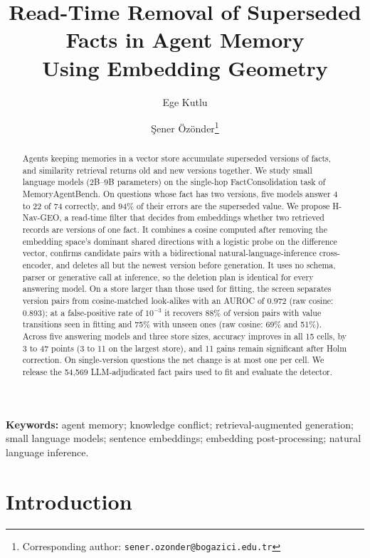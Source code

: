 \documentclass[11pt]{article}
\title{Read-Time Removal of Superseded Facts in Agent Memory\\Using Embedding Geometry}
\author[ ]{Ege Kutlu}
\author[ ]{\c{S}ener \"Oz\"onder\thanks{Corresponding author: \texttt{sener.ozonder@bogazici.edu.tr}}}
\affil[ ]{Institute for Data Science \& Artificial Intelligence, Bo\u{g}azi\c{c}i University, \.{I}stanbul, T\"{u}rkiye}
\date{}
\newcommand{\geo}{H-Nav-GEO}
\begin{document}
\maketitle

\begin{abstract}
\noindent Agents keeping memories in a vector store accumulate superseded versions of facts, and similarity retrieval returns old and new versions together. We study small language models (2B--9B parameters) on the single-hop FactConsolidation task of MemoryAgentBench. On questions whose fact has two versions, five models answer 4 to 22 of 74 correctly, and 94\% of their errors are the superseded value. We propose \geo{}, a read-time filter that decides from embeddings whether two retrieved records are versions of one fact. It combines a cosine computed after removing the embedding space's dominant shared directions with a logistic probe on the difference vector, confirms candidate pairs with a bidirectional natural-language-inference cross-encoder, and deletes all but the newest version before generation. It uses no schema, parser or generative call at inference, so the deletion plan is identical for every answering model. On a store larger than those used for fitting, the screen separates version pairs from cosine-matched look-alikes with an AUROC of 0.972 (raw cosine: 0.893); at a false-positive rate of $10^{-3}$ it recovers 88\% of version pairs with value transitions seen in fitting and 75\% with unseen ones (raw cosine: 69\% and 51\%). Across five answering models and three store sizes, accuracy improves in all 15 cells, by 3 to 47 points (3 to 11 on the largest store), and 11 gains remain significant after Holm correction. On single-version questions the net change is at most one per cell. We release the 54,569 LLM-adjudicated fact pairs used to fit and evaluate the detector.
\end{abstract}

\noindent\textbf{Keywords:} agent memory; knowledge conflict; retrieval-augmented generation; small language models; sentence embeddings; embedding post-processing; natural language inference.

\section{Introduction}
\label{sec:intro}
\end{document}
